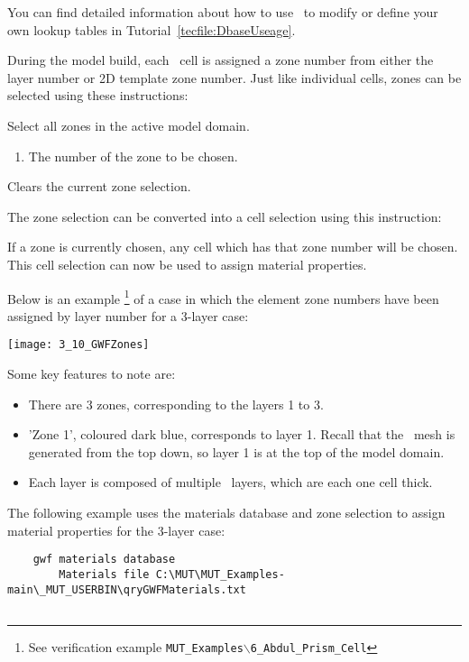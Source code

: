 {You can find detailed information about how to use \dbase\ to modify or define your own lookup tables in Tutorial~\ref{tecfile:DbaseUseage}.

\pagebreak
During the model build, each \gwf\ cell is assigned a zone number from either the layer number or 2D template zone number. Just like individual cells, zones can be selected using these instructions\label{page:zoneSelect}:

    {Select all zones in the active model domain.
     }

    {
        \squish
        \begin{enumerate}
        \item {}  The number of the zone to be chosen.
        \end{enumerate}
        \squish
    }

    {Clears the current zone selection.
     }

The zone selection can be converted into a cell selection using this instruction:

    {If a zone is currently chosen, any cell which has that zone number will be chosen.
     }
This cell selection can now be used to assign material properties.

Below is an example \footnote{See verification example \texttt{MUT\_Examples$\backslash$6\_Abdul\_Prism\_Cell}} of a case in which the element zone numbers have been assigned by layer number for a 3-layer case:

\texttt{[image: 3\_10\_GWFZones]}

\pagebreak
Some key features to note are:
\begin{itemize}
    \item There are 3 zones, corresponding to the layers 1 to 3.
    \item 'Zone 1', coloured dark blue, corresponds to layer 1.  Recall that the \mfus\ mesh is generated from the top down, so layer 1 is at the top of the model domain.
    \item Each layer is composed of multiple \mf\ layers, which are each one cell thick.
\end{itemize}

The following example uses the materials database and zone selection to assign material properties for the 3-layer case:

\begin{verbatim}
    gwf materials database
    	Materials file C:\MUT\MUT_Examples-main\_MUT_USERBIN\qryGWFMaterials.txt


\end{verbatim}}
